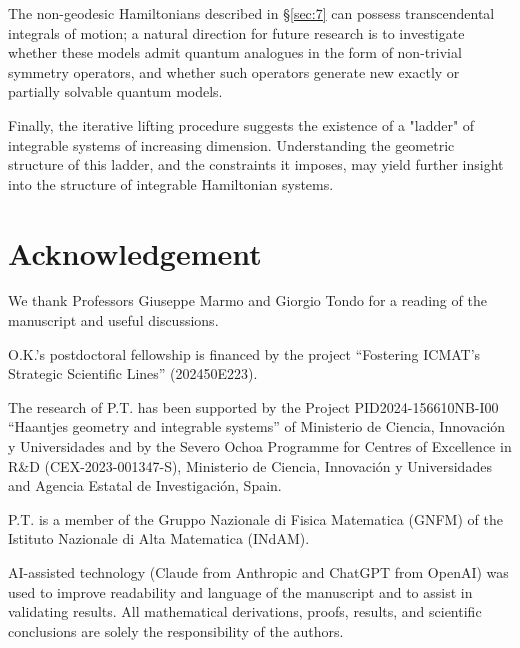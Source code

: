 \documentclass[10pt]{amsart}
\numberwithin{equation}{section}
\theoremstyle{definition}
\begin{document}
The non-geodesic Hamiltonians described in \S\ref{sec:7} can possess transcendental integrals of motion; a natural direction for future research is to investigate whether these models admit quantum analogues in the form of non-trivial symmetry operators, and whether such operators generate new exactly or partially solvable  quantum models. 

Finally, the iterative lifting procedure suggests the existence of a "ladder" of integrable systems of increasing dimension. Understanding the geometric structure of this ladder, and the constraints it imposes, may yield further insight into the structure of integrable Hamiltonian systems.

\section {Acknowledgement}	
	

We thank Professors Giuseppe Marmo and Giorgio Tondo for a reading of the manuscript and useful discussions. 
	
	O.K.'s postdoctoral fellowship is financed by the project ``Fostering ICMAT's Strategic Scientific Lines'' (202450E223). 
	
The research of P.T. has been supported by the Project PID2024-156610NB-I00 ``Haantjes geometry and integrable systems'' of Ministerio de Ciencia, Innovaci\'on y Universidades and by the Severo Ochoa Programme for Centres of Excellence in R\&D
(CEX-2023-001347-S), Ministerio de Ciencia, Innovaci\'{o}n y Universidades and Agencia Estatal de Investigaci\'on, Spain. 
	
P.T. is a member of the Gruppo Nazionale di Fisica Matematica (GNFM) of the Istituto Nazionale di Alta Matematica (INdAM).

AI-assisted technology (Claude from Anthropic and  ChatGPT from OpenAI) was used to improve readability and language of the manuscript and to assist in validating results. All mathematical derivations, proofs, results, and scientific conclusions are solely the responsibility of the authors.
	
\end{document}
